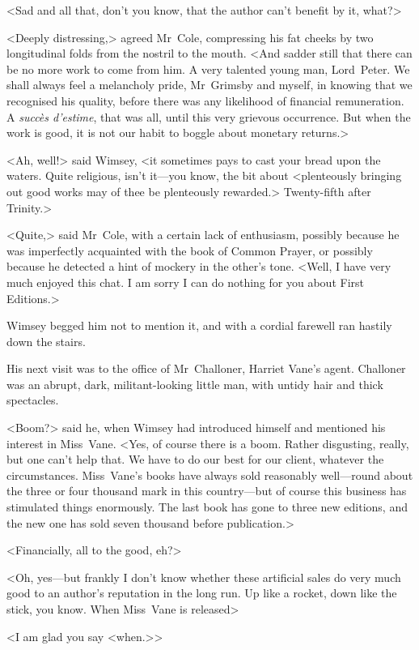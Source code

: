 <Sad and all that, don't you know, that the author can't benefit by it, what?>

<Deeply distressing,> agreed Mr~Cole, compressing his fat cheeks by two longitudinal folds from the nostril to the mouth. <And sadder still that there can be no more work to come from him. A very talented young man, Lord~Peter. We shall always feel a melancholy pride, Mr~Grimsby and myself, in knowing that we recognised his quality, before there was any likelihood of financial remuneration. A \textit{succès d'estime}, that was all, until this very grievous occurrence. But when the work is good, it is not our habit to boggle about monetary returns.>

<Ah, well!> said Wimsey, <it sometimes pays to cast your bread upon the waters. Quite religious, isn't it—you know, the bit about <plenteously bringing out good works may of thee be plenteously rewarded.> Twenty-fifth after Trinity.>

<Quite,> said Mr~Cole, with a certain lack of enthusiasm, possibly because he was imperfectly acquainted with the book of Common Prayer, or possibly because he detected a hint of mockery in the other's tone. <Well, I have very much enjoyed this chat. I am sorry I can do nothing for you about First Editions.>

Wimsey begged him not to mention it, and with a cordial farewell ran hastily down the stairs.

His next visit was to the office of Mr~Challoner, Harriet Vane's agent. Challoner was an abrupt, dark, militant-looking little man, with untidy hair and thick spectacles.

<Boom?> said he, when Wimsey had introduced himself and mentioned his interest in Miss~Vane. <Yes, of course there is a boom. Rather disgusting, really, but one can't help that. We have to do our best for our client, whatever the circumstances. Miss~Vane's books have always sold reasonably well—round about the three or four thousand mark in this country—but of course this business has stimulated things enormously. The last book has gone to three new editions, and the new one has sold seven thousand before publication.>

<Financially, all to the good, eh?>

<Oh, yes—but frankly I don't know whether these artificial sales do very much good to an author's reputation in the long run. Up like a rocket, down like the stick, you know. When Miss~Vane is released\longdash>

<I am glad you say <when.>>

